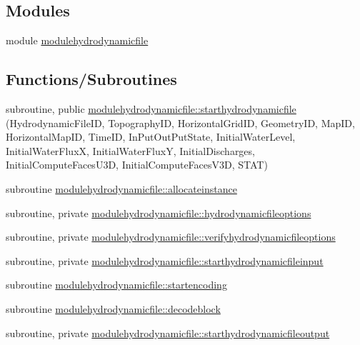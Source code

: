 \subsection*{Modules}
\begin{DoxyCompactItemize}
\item 
module \mbox{\hyperlink{namespacemodulehydrodynamicfile}{modulehydrodynamicfile}}
\end{DoxyCompactItemize}
\subsection*{Functions/\+Subroutines}
\begin{DoxyCompactItemize}
\item 
subroutine, public \mbox{\hyperlink{namespacemodulehydrodynamicfile_afa04d9ff5074b735139f9addb9b466d7}{modulehydrodynamicfile\+::starthydrodynamicfile}} (Hydrodynamic\+File\+ID, Topography\+ID, Horizontal\+Grid\+ID, Geometry\+ID, Map\+ID, Horizontal\+Map\+ID, Time\+ID, In\+Put\+Out\+Put\+State, Initial\+Water\+Level, Initial\+Water\+FluxX, Initial\+Water\+FluxY, Initial\+Discharges, Initial\+Compute\+Faces\+U3D, Initial\+Compute\+Faces\+V3D, S\+T\+AT)
\item 
subroutine \mbox{\hyperlink{namespacemodulehydrodynamicfile_a5235543e6aa405ed126b0ca0fdf38961}{modulehydrodynamicfile\+::allocateinstance}}
\item 
subroutine, private \mbox{\hyperlink{namespacemodulehydrodynamicfile_a091307ffd36898af46af80552e9243ab}{modulehydrodynamicfile\+::hydrodynamicfileoptions}}
\item 
subroutine, private \mbox{\hyperlink{namespacemodulehydrodynamicfile_acd3245c0ac200350cf4d9bd623090e6b}{modulehydrodynamicfile\+::verifyhydrodynamicfileoptions}}
\item 
subroutine, private \mbox{\hyperlink{namespacemodulehydrodynamicfile_aab72ffaa67d987e2e0df7cd6249eac99}{modulehydrodynamicfile\+::starthydrodynamicfileinput}}
\item 
subroutine \mbox{\hyperlink{namespacemodulehydrodynamicfile_a45b05c777eb42ae5c5d23981ba6256da}{modulehydrodynamicfile\+::startencoding}}
\item 
subroutine \mbox{\hyperlink{namespacemodulehydrodynamicfile_ae7f1a97acd1cc5b22e6ff9e638243e70}{modulehydrodynamicfile\+::decodeblock}}
\item 
subroutine, private \mbox{\hyperlink{namespacemodulehydrodynamicfile_a782ea415676eeb21e1368c0c2dd1e710}{modulehydrodynamicfile\+::starthydrodynamicfileoutput}}
\item 

\end{DoxyCompactItemize}
